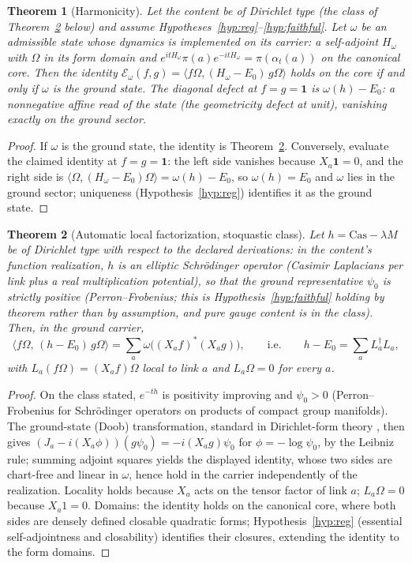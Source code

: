 \documentclass[11pt]{article}
\newtheorem{theorem}{Theorem}[section]
\theoremstyle{definition}
\theoremstyle{remark}
\newcommand{\E}{\mathcal{E}}
\begin{document}
\begin{theorem}[Harmonicity]\label{thm:harmonicity}
Let the content be of Dirichlet type (the class of
Theorem~\ref{thm:factorization} below) and assume
Hypotheses~\ref{hyp:reg}--\ref{hyp:faithful}.  Let $\omega$ be an
admissible state whose dynamics is implemented on its carrier: a
self-adjoint $H_\omega$ with $\Omega$ in its form domain and
$e^{itH_\omega}\pi(a)e^{-itH_\omega} = \pi(\alpha_t(a))$ on the
canonical core.  Then the identity
$\E_\omega(f,g) = \langle f\Omega, (H_\omega - E_0)\, g\Omega\rangle$
holds on the core if and only if $\omega$ is the ground state.  The
diagonal defect at $f = g = \mathbf 1$ is $\omega(h) - E_0$: a
nonnegative affine read of the state (the \emph{geometricity defect}
at unit), vanishing exactly on the ground sector.
\end{theorem}
\begin{proof}
If $\omega$ is the ground state, the identity is
Theorem~\ref{thm:factorization}.  Conversely, evaluate the claimed
identity at $f = g = \mathbf 1$: the left side vanishes because
$X_a\mathbf 1 = 0$, and the right side is
$\langle\Omega, (H_\omega - E_0)\Omega\rangle = \omega(h) - E_0$, so
$\omega(h) = E_0$ and $\omega$ lies in the ground sector; uniqueness
(Hypothesis~\ref{hyp:reg}) identifies it as the ground state.
\end{proof}

\begin{theorem}[Automatic local factorization, stoquastic class]
\label{thm:factorization}
Let $h = \mathrm{Cas} - \lambda M$ be of Dirichlet type with respect to
the declared derivations: in the content's function realization, $h$ is
an elliptic Schr\"odinger operator (Casimir Laplacians per link plus a
real multiplication potential), so that the ground representative
$\psi_0$ is strictly positive (Perron--Frobenius; this is
Hypothesis~\ref{hyp:faithful} holding by theorem rather than by
assumption, and pure gauge content is in the class).  Then, in the
ground carrier,
\[
\langle f\Omega,\,(h - E_0)\,g\Omega\rangle
= \sum_a \omega\big((X_a f)^*(X_a g)\big),
\qquad\text{i.e.}\qquad
h - E_0 = \sum_a L_a^{\dagger} L_a,
\]
with $L_a(f\Omega) = (X_a f)\Omega$ local to link $a$ and $L_a \Omega =
0$ for every $a$.
\end{theorem}
\begin{proof}
On the class stated, $e^{-th}$ is positivity improving and $\psi_0 > 0$
(Perron--Frobenius for Schr\"odinger operators on products of compact
group manifolds).  The ground-state (Doob) transformation, standard
in Dirichlet-form theory \cite{fot}, then gives
$(J_a - i(X_a\phi))(g\psi_0) = -i(X_a g)\psi_0$ for $\phi = -\log
\psi_0$, by the Leibniz rule; summing adjoint squares yields the
displayed identity, whose two sides are chart-free and linear in
$\omega$, hence hold in the carrier independently of the realization.
Locality holds because $X_a$ acts on the tensor factor of link $a$;
$L_a\Omega = 0$ because $X_a 1 = 0$.  Domains: the identity holds on the
canonical core, where both sides are densely defined closable quadratic
forms; Hypothesis~\ref{hyp:reg} (essential self-adjointness and
closability) identifies their closures, extending the identity to the
form domains.
\end{proof}
\end{document}
